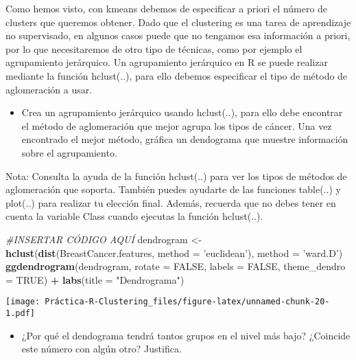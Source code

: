 \documentclass[
]{article}
\newenvironment{Shaded}{\begin{snugshade}}{\end{snugshade}}
\newcommand{\CommentTok}[1]{\textcolor[rgb]{0.56,0.35,0.01}{\textit{#1}}}
\newcommand{\DataTypeTok}[1]{\textcolor[rgb]{0.13,0.29,0.53}{#1}}
\newcommand{\KeywordTok}[1]{\textcolor[rgb]{0.13,0.29,0.53}{\textbf{#1}}}
\newcommand{\NormalTok}[1]{#1}
\newcommand{\OperatorTok}[1]{\textcolor[rgb]{0.81,0.36,0.00}{\textbf{#1}}}
\newcommand{\OtherTok}[1]{\textcolor[rgb]{0.56,0.35,0.01}{#1}}
\newcommand{\StringTok}[1]{\textcolor[rgb]{0.31,0.60,0.02}{#1}}
\providecommand{\tightlist}{%
  \setlength{\itemsep}{0pt}\setlength{\parskip}{0pt}}
\begin{document}
Como hemos visto, con kmeans debemos de especificar a priori el número
de clusters que queremos obtener. Dado que el clustering es una tarea de
aprendizaje no supervisado, en algunos casos puede que no tengamos esa
información a priori, por lo que necesitaremos de otro tipo de técnicas,
como por ejemplo el agrupamiento jerárquico. Un agrupamiento jerárquico
en R se puede realizar mediante la función hclust(..), para ello debemos
especificar el tipo de método de aglomeración a usar.

\begin{itemize}
\tightlist
\item
  Crea un agrupamiento jerárquico usando hclust(..), para ello debe
  encontrar el método de aglomeración que mejor agrupa los tipos de
  cáncer. Una vez encontrado el mejor método, gráfica un dendograma que
  muestre información sobre el agrupamiento.
\end{itemize}

Nota: Consulta la ayuda de la función hclust(..) para ver los tipos de
métodos de aglomeración que soporta. También puedes ayudarte de las
funciones table(..) y plot(..) para realizar tu elección final. Además,
recuerda que no debes tener en cuenta la variable Class cuando ejecutas
la función hclust(..).

\begin{Shaded}
\begin{Highlighting}[]
\CommentTok{#INSERTAR CÓDIGO AQUÍ}
\NormalTok{dendrogram <-}\StringTok{ }\KeywordTok{hclust}\NormalTok{(}\KeywordTok{dist}\NormalTok{(BreastCancer.features, }\DataTypeTok{method =} \StringTok{'euclidean'}\NormalTok{), }\DataTypeTok{method =} \StringTok{'ward.D'}\NormalTok{)}
\KeywordTok{ggdendrogram}\NormalTok{(dendrogram, }\DataTypeTok{rotate =} \OtherTok{FALSE}\NormalTok{, }\DataTypeTok{labels =} \OtherTok{FALSE}\NormalTok{, }\DataTypeTok{theme_dendro =} \OtherTok{TRUE}\NormalTok{) }\OperatorTok{+}\StringTok{ }\KeywordTok{labs}\NormalTok{(}\DataTypeTok{title =} \StringTok{"Dendrograma"}\NormalTok{)}
\end{Highlighting}
\end{Shaded}

\texttt{[image: Práctica-R-Clustering\_files/figure-latex/unnamed-chunk-20-1.pdf]}

\begin{itemize}
\tightlist
\item
  ¿Por qué el dendograma tendrá tantos grupos en el nivel más bajo?
  ¿Coincide este número con algún otro? Justifica.
\end{itemize}
\end{document}
